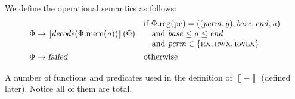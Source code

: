\documentclass[a4paper]{article}
\newcommand{\sem}[1]{\left\llbracket #1 \right\rrbracket}
\newcommand\lau[1]{{\color{purple} \sf \footnotesize {LS: #1}}\\}
\renewcommand\lau[1]{}
\newcommand{\var}[1]{\mathit{#1}}
\newcommand{\gl}{\var{g}}
\newcommand{\pcreg}{\mathrm{pc}}
\newcommand{\addr}{\var{a}}
\newcommand{\start}{\var{base}}
\newcommand{\addrend}{\var{end}}
\newcommand{\perm}{\var{perm}}
\newcommand{\stdcap}[1][(\perm,\gl)]{\left(#1,\start,\addrend,\addr \right)}
\newcommand{\plainproj}[1]{\mathrm{#1}}
\newcommand{\memheap}[1][\Phi]{#1.\plainproj{mem}}
\newcommand{\memreg}[1][\Phi]{#1.\plainproj{reg}}
\newcommand{\failed}{\textsl{failed}}
\newcommand{\plainfun}[2]{
  \ifthenelse{\equal{#2}{}}
  {\mathit{#1}}
  {\mathit{#1}(#2)}
}
\newcommand{\decode}{\plainfun{decode}{}}
\newcommand{\plainperm}[1]{\textsc{#1}}
\newcommand{\exec}{\plainperm{rx}}
\newcommand{\rwx}{\plainperm{rwx}}
\newcommand{\rwlx}{\plainperm{rwlx}}
\begin{document}
We define the operational semantics as follows:
\begin{align*}
  \Phi & \rightarrow \sem{\decode(\memheap(\addr))}(\Phi) & &                                   
                                                              \arraycolsep=0pt
                                                              \begin{array}{l}
                                                                \text{if $\memreg(\pcreg) = \stdcap$}\\
                                                                \quad\text{and $\start \leq \addr \leq \addrend$}\\
                                                                \quad\text{and $\perm \in \{ \exec,\rwx, \rwlx \}$ }
                                                              \end{array}\\
  \Phi & \rightarrow \failed                                 & & \text{otherwise}
\end{align*}
\lau{With respect to our talk about whether the upper bound should be included in the range of authority or not, I have found one example where it would work better when the upper-bound is not included. If we have a stack and call and want to pass the empty part on, then if the unused part of the stack is 0 cells, then we cannot pass anything that ``looks like a stack''.}
A number of functions and predicates used in the definition of $\sem{-}$ (defined later). Notice all of them are total.
\end{document}
